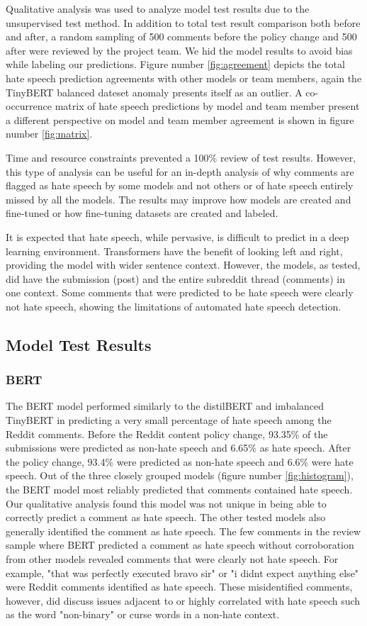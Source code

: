 \documentclass[conference]{IEEEtran}
\begin{document}
Qualitative analysis was used to analyze model test results due to the unsupervised test method. In addition to total test result comparison both before and after, a random sampling of 500 comments before the policy change and 500 after were reviewed by the project team. We hid the model results to avoid bias while labeling our predictions. Figure number \ref{fig:agreement} depicts the total hate speech prediction agreements with other models or team members, again the TinyBERT balanced dateset anomaly presents itself as an outlier. A co-occurrence matrix of hate speech predictions by model and team member present a different perspective on model and team member agreement is shown in figure number \ref{fig:matrix}. 

Time and resource constraints prevented a 100\% review of test results. However, this type of analysis can be useful for an in-depth analysis of why comments are flagged as hate speech by some models and not others or of hate speech entirely missed by all the models. The results may improve how models are created and fine-tuned or how fine-tuning datasets are created and labeled. 

It is expected that hate speech, while pervasive, is difficult to predict in a deep learning environment. Transformers have the benefit of looking left and right, providing the model with wider sentence context. However, the models, as tested, did have the submission (post) and the entire subreddit thread (comments) in one context. Some comments that were predicted to be hate speech were clearly not hate speech, showing the limitations of automated hate speech detection.

\subsection{Model Test Results}
\subsubsection{BERT}
The BERT model performed similarly to the distilBERT and imbalanced TinyBERT in predicting a very small percentage of hate speech among the Reddit comments. Before the Reddit content policy change, 93.35\% of the submissions were predicted as non-hate speech and 6.65\% as hate speech. After the policy change, 93.4\% were predicted as non-hate speech and 6.6\% were hate speech. Out of the three closely grouped models (figure number \ref{fig:histogram}), the BERT model most reliably predicted that comments contained hate speech. Our qualitative analysis found this model was not unique in being able to correctly predict a comment as hate speech. The other tested models also generally identified the comment as hate speech. The few comments in the review sample where BERT predicted a comment as hate speech without corroboration from other models revealed comments that were clearly not hate speech. For example, "that was perfectly executed bravo sir" or "i didnt expect anything else" were Reddit comments identified as hate speech.  These misidentified comments, however, did discuss issues adjacent to or highly correlated with hate speech such as the word "non-binary" or curse words in a non-hate context. 
\end{document}
